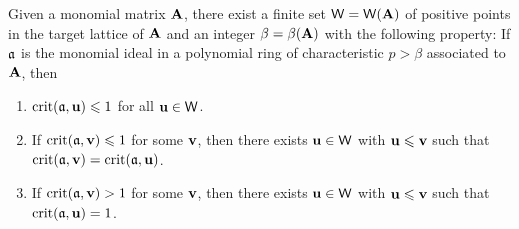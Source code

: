 \documentclass{article}
\begin{document}
\begin{proposition}
   \label{finite-representatives-small-crits: P}
   Given a monomial matrix $\mathbf{A}$, there exist a finite set $\mathsf{W}=\mathsf{W}(\mathbf{A})$ of positive points in the target lattice of $\mathbf{A}$ and an integer $\beta = \beta(\mathbf{A})$ with the following property\textup:
   If $\mathfrak{a}$ is the monomial ideal in a polynomial ring of characteristic $p>\beta$ associated to $\mathbf{A}$, then 
   \begin{enumerate}[$(1)$]
      \item $\operatorname{crit}(\mathfrak{a},\mathbf{u}) \leqslant 1$ for all $\mathbf{u} \in \mathsf{W}$.
      \item If $\operatorname{crit}(\mathfrak{a},\mathbf{v}) \leqslant 1$ for some $\mathbf{v}$, then there exists $\mathbf{u} \in \mathsf{W}$ with $\mathbf{u} \leqslant \mathbf{v}$ such that $\operatorname{crit}(\mathfrak{a},\mathbf{v}) = \operatorname{crit}(\mathfrak{a},\mathbf{u})$.
      \item If $\operatorname{crit}(\mathfrak{a},\mathbf{v}) > 1$ for some $\mathbf{v}$, then there exists $\mathbf{u} \in \mathsf{W}$ with $\mathbf{u}\leqslant \mathbf{v}$ such that $\operatorname{crit}(\mathfrak{a}, \mathbf{u}) = 1$.
   \end{enumerate}
\end{proposition}
\end{document}
